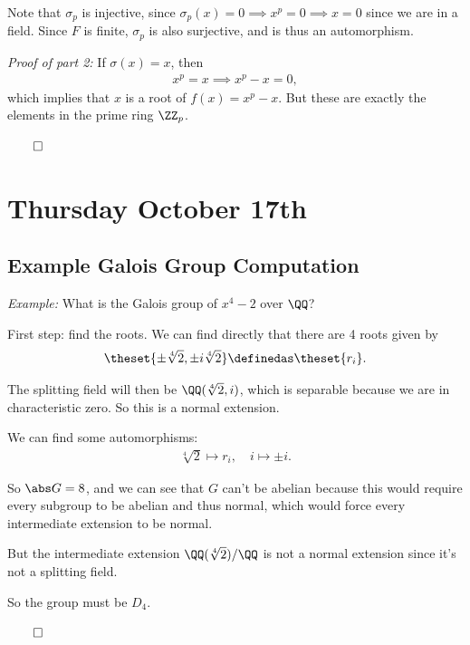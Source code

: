 Note that \(\sigma_p\) is injective, since
\(\sigma_p(x) =0 \implies x^p=0 \implies x=0\) since we are in a field.
Since \(F\) is finite, \(\sigma_p\) is also surjective, and is thus an
automorphism.

\emph{Proof of part 2:} If \(\sigma(x) = x\), then
\begin{align*}
x^p = x \implies x^p-x = 0
,\end{align*} which implies that \(x\) is a root of \(f(x) = x^p - x\).
But these are exactly the elements in the prime ring \(\ZZ_p\).

\(\qed\)

\hypertarget{thursday-october-17th}{%
\section{Thursday October 17th}\label{thursday-october-17th}}

\hypertarget{example-galois-group-computation}{%
\subsection{Example Galois Group
Computation}\label{example-galois-group-computation}}

\emph{Example:} What is the Galois group of \(x^4-2\) over \(\QQ\)?

First step: find the roots. We can find directly that there are 4 roots
given by
\begin{align*}
\theset{\pm \sqrt[4] 2, \pm i \sqrt[4] 2} \definedas \theset{r_i}
.\end{align*}

The splitting field will then be \(\QQ(\sqrt[4] 2, i)\), which is
separable because we are in characteristic zero. So this is a normal
extension.

We can find some automorphisms:
\begin{align*}
\sqrt[4] 2 \mapsto r_i, \quad i \mapsto \pm i
.\end{align*}

So \(\abs G = 8\), and we can see that \(G\) can't be abelian because
this would require every subgroup to be abelian and thus normal, which
would force every intermediate extension to be normal.

But the intermediate extension \(\QQ(\sqrt[4] 2)/\QQ\) is not a normal
extension since it's not a splitting field.

So the group must be \(D_4\).

\(\qed\)


